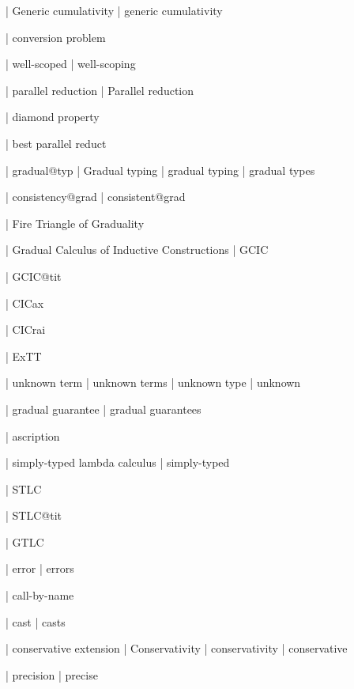   | Generic cumulativity
  | generic cumulativity





  | conversion problem

  | well-scoped
  | well-scoping

  | parallel reduction
  | Parallel reduction

  | diamond property

  | best parallel reduct


  | gradual@typ
  | Gradual typing
  | gradual typing
  | gradual types

  | consistency@grad
  | consistent@grad

  | Fire Triangle of Graduality

  | Gradual Calculus of Inductive Constructions
  | GCIC

  | GCIC@tit


  | CICax

  | CICrai

  | ExTT

  | unknown term
  | unknown terms
  | unknown type
  | unknown

  | gradual guarantee
  | gradual guarantees

  | ascription

  | simply-typed lambda calculus
  | simply-typed

  | STLC

  | STLC@tit

  | GTLC

  | error
  | errors

  | call-by-name

  | cast
  | casts

  | conservative extension
  | Conservativity
  | conservativity
  | conservative

  | precision
  | precise

